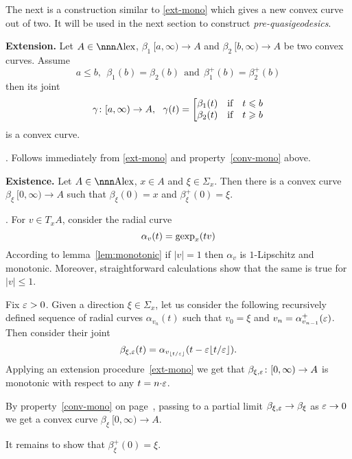 \documentclass{article}
\begin{document}
The next is a construction similar to \ref{ext-mono} which gives a new convex
curve out of two. 
It will be used in the next section to construct \emph{pre-quasigeodesics}.

\begin{thm}{\bf Extension.}\label{ext-conv}
Let $A\in\Alex$, $\beta_1\:[a,\infty)\to A$ and $\beta_2\:[b,\infty)\to A$ be two
convex curves. 
Assume $$a\le b,\ \ \beta_1(b)=\beta_2(b)\ \ \text{and}\ \ 
\beta^+_1(b)=\beta^+_2(b)$$ 
then its joint
$$\gamma\colon[a,\infty)\to A,\ \ \gamma(t)=\left[
\begin{matrix}
\beta_1(t)&\text{if}&t\leqslant b\\
\beta_2(t)&\text{if}&t\geqslant b
\end{matrix}\right.$$
is a convex curve.
\end{thm}

\Proof. Follows immediately from \ref{ext-mono} and property~\ref{conv-mono} above.



\begin{thm}{\bf Existence.} 
Let $A\in\Alex$, $x\in A$ and $\xi\in \Sigma_x$. 
Then there is a convex curve $\beta_\xi\:[0,\infty)\to A$ such that
$\beta_\xi(0)=x$ and $\beta_\xi^+(0)=\xi$.
\end{thm}

\Proof.
For $v\in T_x A$, consider the radial curve
$$\alpha_v(t)=\operatorname{gexp}_x(t v)$$
According to lemma~\ref{lem:monotonic} if $|v|=1$ then $\alpha_v$ is
$1$-Lipschitz and monotonic. 
Moreover, straightforward calculations show that the same is true for $|v|\le 1$.

Fix $\varepsilon>0$. Given a direction $\xi\in \Sigma_x$, let us consider the following recursively
defined sequence of radial curves $\alpha_{v_n}(t)$ such that $v_0=\xi$ and
$v_{n}=\alpha^+_{v_{n-1}}(\varepsilon)$.
Then consider their joint
$$\beta_{\xi,\varepsilon}(t)=\alpha_{v_{\lfloor t/\varepsilon\rfloor}}(t-\varepsilon\lfloor
t/\varepsilon\rfloor).$$
Applying an extension procedure~\ref{ext-mono} we get that
$\beta_{\xi,\varepsilon}\colon[0,\infty)\to A$ is monotonic with respect to any $t=n{\cdot}\varepsilon$.

By property~\ref{conv-mono} on page~\pageref{conv-mono}, passing to a partial
limit $\beta_{\xi,\varepsilon}\to\beta_{\xi}$ as $\varepsilon\to 0$ we get a convex curve
$\beta_{\xi}\:[0,\infty)\to A$.

It remains to show that $\beta_{\xi}^+(0)=\xi$.
\end{document}
